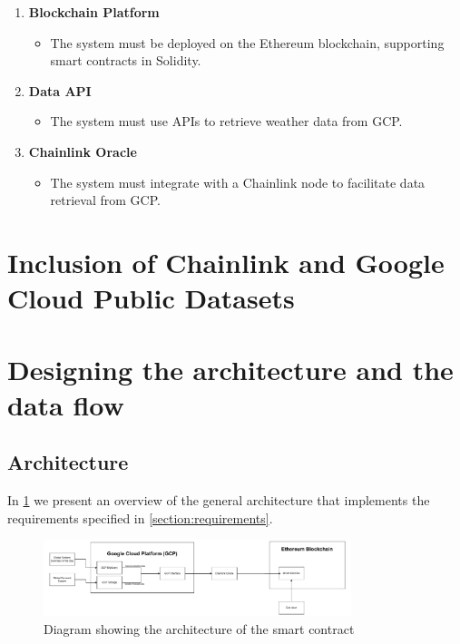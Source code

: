 \begin{enumerate}
    \item \textbf{Blockchain Platform}
    \begin{itemize}
        \item The system must be deployed on the Ethereum blockchain, supporting smart contracts in Solidity.
    \end{itemize}
    
    \item \textbf{Data API}
    \begin{itemize}
        \item The system must use APIs to retrieve weather data from GCP.
    \end{itemize}
    
    \item \textbf{Chainlink Oracle}
    \begin{itemize}
        \item The system must integrate with a Chainlink node to facilitate data retrieval from GCP.
    \end{itemize}
\end{enumerate}

\section{Inclusion of Chainlink and Google Cloud Public Datasets}\label{section:inclusion_chainlink_google_cloud_datasets}
\section{Designing the architecture and the data flow}\label{section:designing_architecture_data_flow}

\subsection{Architecture}

In \ref{fig:architecture} we present an overview of the general architecture that implements the requirements specified in \ref{section:requirements}. 

\begin{figure}[h]
    \centering
    \includegraphics[width=0.8\textwidth]{figures/architecture-overview.drawio.pdf}
    \caption{Diagram showing the architecture of the smart contract}
    \label{fig:architecture}
\end{figure}